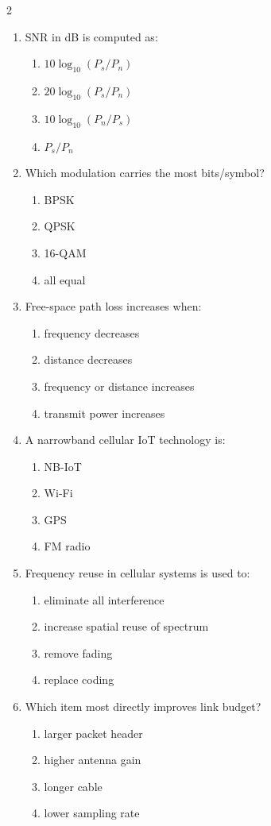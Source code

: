 \begin{multicols}{2}
\begin{enumerate}[leftmargin=*, itemsep=0.4em]
\item SNR in dB is computed as:
\begin{enumerate}[label=\alph*)]
\item $10\log_{10}(P_s/P_n)$
\item $20\log_{10}(P_s/P_n)$
\item $10\log_{10}(P_n/P_s)$
\item $P_s/P_n$
\end{enumerate}

\item Which modulation carries the most bits/symbol?
\begin{enumerate}[label=\alph*)]
\item BPSK
\item QPSK
\item 16-QAM
\item all equal
\end{enumerate}

\item Free-space path loss increases when:
\begin{enumerate}[label=\alph*)]
\item frequency decreases
\item distance decreases
\item frequency or distance increases
\item transmit power increases
\end{enumerate}

\item A narrowband cellular IoT technology is:
\begin{enumerate}[label=\alph*)]
\item NB-IoT
\item Wi-Fi
\item GPS
\item FM radio
\end{enumerate}

\item Frequency reuse in cellular systems is used to:
\begin{enumerate}[label=\alph*)]
\item eliminate all interference
\item increase spatial reuse of spectrum
\item remove fading
\item replace coding
\end{enumerate}

\item Which item most directly improves link budget?
\begin{enumerate}[label=\alph*)]
\item larger packet header
\item higher antenna gain
\item longer cable
\item lower sampling rate
\end{enumerate}


\end{enumerate}
\end{multicols}
